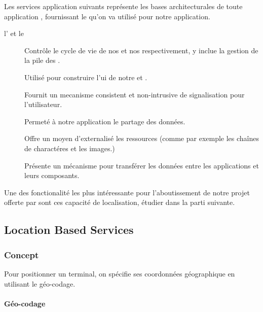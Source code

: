 Les services application suivants représente les bases architecturales de toute application \android{}, fournissant le  qu'on va utilisé pour notre application.

\begin{description}

\item [l' et le ]
Contrôle le cycle de vie de nos  et nos  respectivement, y inclue la gestion de la pile des .

\item[]
Utilisé pour construire l'\gls{ui} de notre  et .

\item[]
Fournit un mecanisme consistent et non-intrusive de signalisation pour l'utilisateur.

\item[]
Permeté à notre application le partage des données.

\item[]
Offre un moyen d'externalisé les ressources (comme par exemple les chaînes de charactéres et les images.)

\item[]
Présente un mécanisme pour transférer les données entre les applications et leurs composants.

\end{description}

Une des fonctionalité les plus intéressante pour l'aboutissement de notre projet offerte par \android{} sont ces capacité de localisation, étudier dans la parti suivante.

\subsection{Location Based Services}

\subsubsection{Concept}

Pour positionner un terminal, on spécifie ses coordonnées géographique
en utilisant le géo-codage.

\paragraph[Géo-codage]{Géo-codage\cite{wiki:geocoding}}

